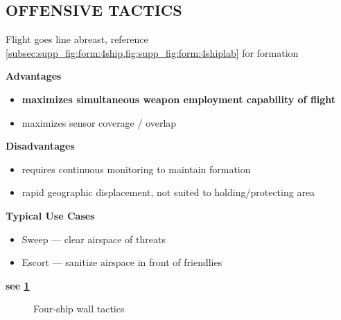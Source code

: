 
\clearpage

\subsection{OFFENSIVE TACTICS}

\begin{tcoloritemize}
    \blueitem[Wall]
    Flight goes line abreast, 
    reference \cref{subsec:supp_fig:form:4ship,fig:supp_fig:form:4shiplab}
    for formation

    \bigskip
    \textbf{Advantages}
    \begin{itemize}
        \item \textbf{maximizes simultaneous weapon employment capability of flight}
        \item maximizes sensor coverage / overlap
    \end{itemize}

    \textbf{Disadvantages}
    \begin{itemize}
        \item requires continuous monitoring to maintain formation
        \item rapid geographic displacement, 
        not suited to holding/protecting area
    \end{itemize}
    
    \textbf{Typical Use Cases}
    \begin{itemize}
        \item Sweep --- clear airspace of threats
        \item Escort --- sanitize airspace in front of friendlies
    \end{itemize}
    \hfill\textbf{see \cref{fig:ttp_aa:4ship:offensive:wall}}
\end{tcoloritemize}

\begin{figure}[htbp]
    \centering
    \caption{Four-ship wall tactics}%
    \label{fig:ttp_aa:4ship:offensive:wall}
\end{figure}

